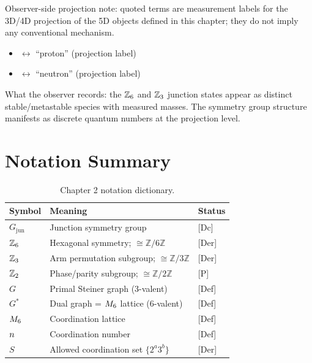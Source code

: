 \begin{observerbox}
Observer-side projection note: quoted terms are measurement labels for the
3D/4D projection of the 5D objects defined in this chapter; they do not
imply any conventional mechanism.

\begin{itemize}
    \item \AnchorJunction{} $\leftrightarrow$ ``proton'' (projection label)
    \item \MetastableJunction{} $\leftrightarrow$ ``neutron'' (projection label)
\end{itemize}

What the observer records: the $\mathbb{Z}_6$ and $\mathbb{Z}_3$ junction states appear
as distinct stable/metastable species with measured masses. The symmetry
group structure manifests as discrete quantum numbers at the projection level.
\end{observerbox}

\section{Notation Summary}
\label{sec:junction:notation}

\begin{table}[htbp]
\centering
\caption{Chapter 2 notation dictionary.}
\label{tab:ch2_notation}
\begin{tabular}{lll}
    \toprule
    \textbf{Symbol} & \textbf{Meaning} & \textbf{Status} \\
    \midrule
    $G_{\text{jun}}$ & Junction symmetry group & [Dc] \\
    $\mathbb{Z}_6$ & Hexagonal symmetry; $\cong \mathbb{Z}/6\mathbb{Z}$ & [Der] \\
    $\mathbb{Z}_3$ & Arm permutation subgroup; $\cong \mathbb{Z}/3\mathbb{Z}$ & [Der] \\
    $\mathbb{Z}_2$ & Phase/parity subgroup; $\cong \mathbb{Z}/2\mathbb{Z}$ & [P] \\
    $G$ & Primal Steiner graph (3-valent) & [Def] \\
    $G^*$ & Dual graph = $M_6$ lattice (6-valent) & [Def] \\
    $M_6$ & Coordination lattice & [Def] \\
    $n$ & Coordination number & [Def] \\
    $S$ & Allowed coordination set $\{2^a 3^b\}$ & [Der] \\
    \bottomrule
\end{tabular}
\end{table}

